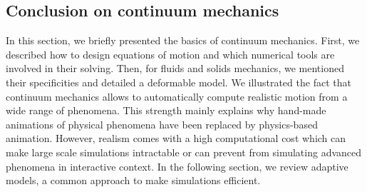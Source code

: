 \subsection{Conclusion on continuum mechanics}
In this section, we briefly presented the basics of continuum mechanics.
First, we described how to design equations of motion and which numerical tools are involved in their solving. 
Then, for fluids and solids mechanics, we mentioned their specificities and detailed a deformable model.
We illustrated the fact that continuum mechanics allows to automatically compute realistic motion from a wide range of phenomena.
This strength mainly explains why hand-made animations of physical phenomena have been replaced by physics-based animation.
However, realism comes with a high computational cost which can make large scale simulations intractable or can prevent from simulating advanced phenomena in interactive context.
In the following section, we review adaptive models, a common approach to make simulations efficient.
